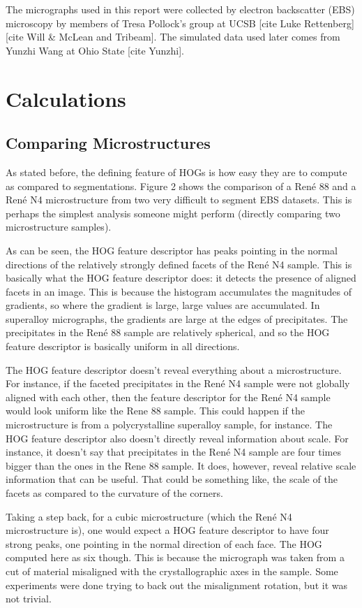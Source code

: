 \documentclass[review]{elsarticle}
\begin{document}
	The micrographs used in this report were collected by electron backscatter (EBS) microscopy by members of Tresa Pollock's group at UCSB [cite Luke Rettenberg] [cite Will \& McLean and Tribeam]. The simulated data used later comes from Yunzhi Wang at Ohio State [cite Yunzhi].

	\section{Calculations}
	\subsection{Comparing Microstructures}
	As stated before, the defining feature of HOGs is how easy they are to compute as compared to segmentations. Figure 2 shows the comparison of a Ren\'e 88 and a Ren\'e N4 microstructure from two very difficult to segment EBS datasets. This is perhaps the simplest analysis someone might perform (directly comparing two microstructure samples).
	
	As can be seen, the HOG feature descriptor has peaks pointing in the normal directions of the relatively strongly defined facets of the Ren\'e N4 sample. This is basically what the HOG feature descriptor does: it detects the presence of aligned facets in an image. This is because the histogram accumulates the magnitudes of gradients, so where the gradient is large, large values are accumulated. In superalloy micrographs, the gradients are large at the edges of precipitates. The precipitates in the Ren\'e 88 sample are relatively spherical, and so the HOG feature descriptor is basically uniform in all directions.
	
	The HOG feature descriptor doesn't reveal everything about a microstructure. For instance, if the faceted precipitates in the Ren\'e N4 sample were not globally aligned with each other, then the feature descriptor for the Ren\'e N4 sample would look uniform like the Rene 88 sample. This could happen if the microstructure is from a polycrystalline superalloy sample, for instance. The HOG feature descriptor also doesn't directly reveal information about scale. For instance, it doesn't say that precipitates in the Ren\'e N4 sample are four times bigger than the ones in the Rene 88 sample. It does, however, reveal relative scale information that can be useful. That could be something like, the scale of the facets as compared to the curvature of the corners.
		
	Taking a step back, for a cubic microstructure (which the Ren\'e N4 microstructure is), one would expect a HOG feature descriptor to have four strong peaks, one pointing in the normal direction of each face. The HOG computed here as six though. This is because the micrograph was taken from a cut of material misaligned with the crystallographic axes in the sample. Some experiments were done trying to back out the misalignment rotation, but it was not trivial.
		
\end{document}
